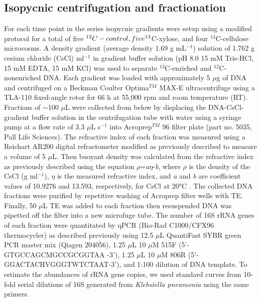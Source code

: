 \documentclass{article}
\begin{document}
\subsection{Isopycnic centrifugation and fractionation}
For each time point in the series isopycnic gradients were setup using
a modified protocol \citep{Neufeld_2007} for a total of five
$^{12}C-control, five \textsuperscript{13}$C-xylose, and four
$^{13}$C-cellulose microcosms. A density gradient (average density
1.69 g mL$^{-1}$) solution of 1.762 g cesium chloride (CsCl)
ml$^{-1}$ in gradient buffer solution (pH 8.0 15 mM Tris-HCl, 15
mM EDTA, 15 mM KCl) was used to separate $^{13}$C-enriched and
$^{12}$C-nonenriched DNA. Each gradient was loaded with
approximately 5 $\mu$g of DNA and centrifuged on a Beckman Coulter
Optima$^{TM}$ MAX-E ultracentrifuge using a TLA-110 fixed-angle
rotor for 66 h at 55,000 rpm and room temperature (RT). Fractions of $\sim$100
$\mu$L were collected from below by displacing the DNA-CsCl-gradient buffer
solution in the centrifugation tube with water using a syringe pump at a flow
rate of 3.3 $\mu$L s$^{-1}$ \citep{Manefield_2002} into
Acroprep$^{TM}$ 96 filter plate (part no. 5035, Pall Life
Sciences). The refractive index of each fraction was measured using a Reichart
AR200 digital refractometer modified as previously described
\citep{Buckley_2007} to measure a volume of 5 $\mu$L. Then buoyant density was
calculated from the refractive index as previously described
\citep{Buckley_2007} using the equation $\rho$=\textit{a}$\eta$-\textit{b},
where $\rho$ is the density of the CsCl (g ml$^{-1}$), $\eta$ is
the measured refractive index, and \textit{a} and \textit{b} are coefficient
values of 10.9276 and 13.593, respectively, for CsCl at 20°C
\citep{9780408708036}. The collected DNA fractions were purified by repetitive
washing of Acroprep filter wells with TE. Finally, 50 $\mu$L TE was added to
each fraction then resuspended DNA was pipetted off the filter into a new
microfuge tube. The number of 16S rRNA genes of each fraction were quantitated
by qPCR (Bio-Rad C1000/CFX96 thermocycler) as described previously
\citep{Berthrong_2013} using 12.5 $\mu$L QuantiFast SYBR green PCR  master mix
(Qiagen 204056), 1.25 $\mu$L 10 $\mu$M 515F (5'-GTGCCAGCMGCCGCGGTAA -3'), 1.25
$\mu$L 10 $\mu$M 806R (5'-GGACTACHVGGGTWTCTAAT-3'), and 1:100 dilution of DNA
template. To estimate the abundances of rRNA gene copies, we used standard
curves from 10-fold serial dilutions of 16S generated from \textit{Klebsiella
pneumonia} using the same primers.   
\end{document}
